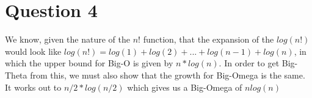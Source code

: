 \documentclass{article}
\begin{document}
\section{Question 4}
We know, given the nature of the $n!$ function, that the expansion of the $log(n!)$ would look like $log(n!) = log(1) + log(2) + ... + log(n-1) + log(n)$, in which the upper bound for Big-O is given by $n*log(n)$. In order to get Big-Theta from this, we must also show that the growth for Big-Omega is the same. It works out to $n/2 * log(n/2)$ which gives us a Big-Omega of $n log(n)$
\end{document}
